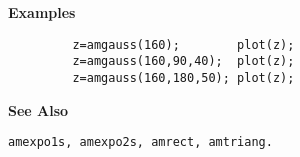 {\bf \large {}\selectfont Examples}
\begin{verbatim}
         z=amgauss(160);        plot(z);
         z=amgauss(160,90,40);  plot(z);
         z=amgauss(160,180,50); plot(z);
\end{verbatim}
\vspace*{.5cm}


{\bf \large {}\selectfont See Also}\\
\hspace*{1.5cm}
\begin{minipage}[t]{13.5cm}
\begin{verbatim}
amexpo1s, amexpo2s, amrect, amtriang.
\end{verbatim}
\end{minipage}

